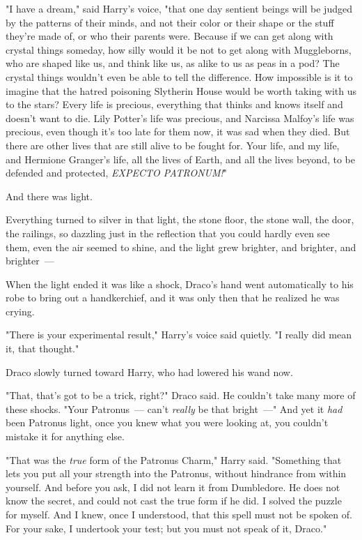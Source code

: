 "I have a dream," said Harry's voice, "that one day sentient beings will be
judged by the patterns of their minds, and not their color or their shape or
the stuff they're made of, or who their parents were. Because if we can get
along with crystal things someday, how silly would it be not to get along with
Muggleborns, who are shaped like us, and think like us, as alike to us as peas
in a pod? The crystal things wouldn't even be able to tell the difference. How
impossible is it to imagine that the hatred poisoning Slytherin House would be
worth taking with us to the stars? Every life is precious, everything that
thinks and knows itself and doesn't want to die. Lily Potter's life was
precious, and Narcissa Malfoy's life was precious, even though it's too late
for them now, it was sad when they died. But there are other lives that are
still alive to be fought for. Your life, and my life, and Hermione Granger's
life, all the lives of Earth, and all the lives beyond, to be defended and
protected, \emph{EXPECTO PATRONUM!}"

And there was light.

Everything turned to silver in that light, the stone floor, the stone wall, the
door, the railings, so dazzling just in the reflection that you could hardly
even see them, even the air seemed to shine, and the light grew brighter, and
brighter, and brighter~---

When the light ended it was like a shock, Draco's hand went automatically to
his robe to bring out a handkerchief, and it was only then that he realized he
was crying.

"There is your experimental result," Harry's voice said quietly. "I really did
mean it, that thought."

Draco slowly turned toward Harry, who had lowered his wand now.

"That, that's got to be a trick, right?" Draco said. He couldn't take many more
of these shocks. "Your Patronus~--- can't \emph{really} be that bright~---" And
yet it \emph{had} been Patronus light, once you knew what you were looking at,
you couldn't mistake it for anything else.

"That was the \emph{true} form of the Patronus Charm," Harry said. "Something
that lets you put all your strength into the Patronus, without hindrance from
within yourself. And before you ask, I did not learn it from Dumbledore. He
does not know the secret, and could not cast the true form if he did. I solved
the puzzle for myself. And I knew, once I understood, that this spell must not
be spoken of. For your sake, I undertook your test; but you must not speak of
it, Draco."

